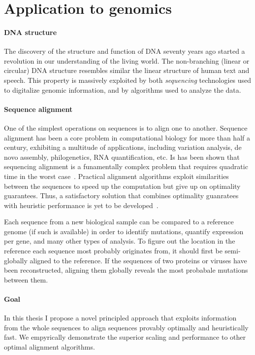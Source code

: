 \section*{Application to genomics}

\paragraph{DNA structure} The discovery of the structure and function of
DNA\citep{watson1953structure} seventy years ago started a revolution in our
understanding of the living world. The non-branching (linear or circular) DNA
structure resembles similar the linear structure of human text and speech. This
property is massively exploited by both \emph{sequencing} technologies used to
digitalize genomic information, and by algorithms used to analyze the data.

\paragraph{Sequence alignment} One of the simplest operations on sequences is to
align one to another. Sequence alignment has been a core problem in
computational biology for more than half a century, exhibiting a multitude of
applications, including variation analysis, de novo assembly, philogenetics, RNA
quantification, etc. Is has been shown that sequencing alignment is a
funamentally complex problem that requires quadratic time in the worst
case~\citep{backurs2015edit}. Practical alignment algorithms exploit
similarities between the sequences to speed up the computation but give up on
optimality guarantees. Thus, a satisfactory solution that combines optimality
guanratees with heuristic performance is yet to be
developed~\citep{medvedev2022theoretical}.

Each sequence from a new biological sample can be compared to a reference genome
(if such is available) in order to identify mutations, quantify expression per
gene, and many other types of analysis. To figure out the location in the
reference each sequence most probably originates from, it should first be
semi-globally aligned to the reference. If the sequences of two proteins or
viruses have been reconstructed, aligning them globally reveals the most
probabale mutations between them.

\paragraph{Goal} In this thesis I propose a novel principled approach that
exploits information from the whole sequences to align sequences provably
optimally and heuristically fast. We empyrically demonstrate the superior
scaling and performance to other optimal alignment algorithms.

